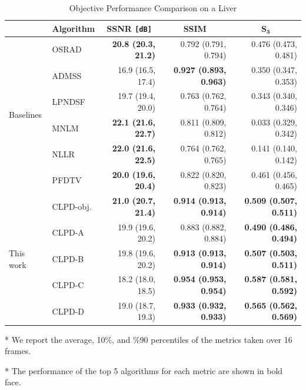 
%
\begin{table}
  \centering
  \caption{Objective Performance Comparison on a Liver}\label{table:liver1}
  \begin{threeparttable}
  \begin{tabular}{llrrr}
    \toprule
    & \multicolumn{1}{c}{\textbf{Algorithm}}
    & \multicolumn{1}{c}{\textbf{SSNR} \texttt{[dB]}}
    & \multicolumn{1}{c}{\textbf{SSIM}}
    & \multicolumn{1}{c}{\(\mathbf{S_{3}}\)} \\\midrule
    \multirow{6}{*}{Baselines} & OSRAD & \textbf{20.8 (20.3, 21.2)} & 0.792 (0.791, 0.794) & 0.476 (0.473, 0.481)\\
    & ADMSS & 16.9 (16.5, 17.4) & \textbf{0.927 (0.893, 0.963)} & 0.350 (0.347, 0.353) \\
    & LPNDSF & 19.7 (19.4, 20.0) & 0.763 (0.762, 0.764)         & 0.343 (0.340, 0.346) \\
    & MNLM & \textbf{22.1 (21.6, 22.7)} & 0.811 (0.809, 0.812)  & 0.033 (0.329, 0.342) \\
    & NLLR & \textbf{22.0 (21.6, 22.5)} & 0.764 (0.762, 0.765)  & 0.141 (0.140, 0.142) \\
    & PFDTV & \textbf{20.0 (19.6, 20.4)} & 0.822 (0.820, 0.823) & 0.461 (0.456, 0.465) \\
    \midrule
    \multirow{5}{*}{This work} & CLPD-obj.  & \textbf{21.0 (20.7, 21.4)} & \textbf{0.914 (0.913, 0.914)} & \textbf{0.509 (0.507, 0.511)} \\
    & CLPD-A  & 19.9 (19.6, 20.2) & 0.883 (0.882, 0.884) & \textbf{0.490 (0.486, 0.494)} \\
    & CLPD-B  & 19.8 (19.6, 20.2) & \textbf{0.913 (0.913, 0.914)} & \textbf{0.507 (0.503, 0.511)} \\
    & CLPD-C  & 18.2 (18.0, 18.5) & \textbf{0.954 (0.953, 0.954)} & \textbf{0.587 (0.581, 0.592)} \\
    & CLPD-D & 19.0 (18.7, 19.3) & \textbf{0.933 (0.932, 0.933)} &  \textbf{0.565 (0.562, 0.569)} \\\bottomrule
  \end{tabular}
  \begin{tablenotes}
    \item[*] We report the average, 10\%, and \%90 percentiles of the metrics taken over 16 frames.
    \item[*] The performance of the top 5 algorithms for each metric are shown in bold face.
  \end{tablenotes}
  \end{threeparttable}
\end{table}
%
